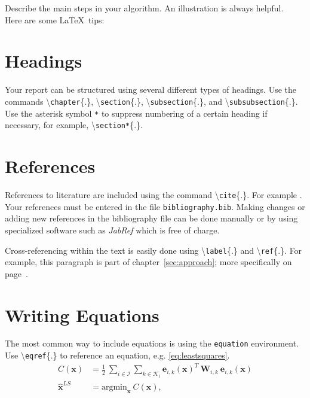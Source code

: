 Describe the main steps in your algorithm. An illustration is always helpful.\\

Here are some \LaTeX~tips:


\section{Headings}

  Your report can be structured using several different types of headings. Use the commands \textbackslash\texttt{chapter}\{.\}, \textbackslash\texttt{section}\{.\}, \textbackslash\texttt{subsection}\{.\}, and \textbackslash\texttt{subsubsection}\{.\}. Use the asterisk symbol \texttt{*} to suppress numbering of a certain heading if necessary, for example, \textbackslash\texttt{section*}\{.\}.


\section{References}\label{sec:references}

  References to literature are included using the command \textbackslash\texttt{cite}\{.\}. For example \cite{KleinMurray2007,Strasdat2010WhyFilter}. Your references must be entered in the file \texttt{bibliography.bib}. Making changes or adding new references in the bibliography file can be done manually or by using specialized software such as \textit{JabRef} which is free of charge.

  Cross-referencing within the text is easily done using \textbackslash\texttt{label}\{.\} and \textbackslash\texttt{ref}\{.\}. For example, this paragraph is part of chapter~\ref{sec:approach}; more specifically on page~\pageref{sec:references}.

\section{Writing Equations}\label{sec:math}

  The most common way to include equations is using the \texttt{equation} environment. Use \textbackslash\texttt{eqref}\{.\} to reference an equation, e.g. \eqref{eq:leastsquares}.
  \begin{equation}\label{eq:leastsquares}
      \begin{aligned}
        C(\mathbf{x}) &= \frac{1}{2} \ \sum_{i \in \mathcal I} \sum_{k \in \mathcal K_i} \mathbf{e}_{i,k}(\mathbf{x})^T \ \mathbf{W}_{i,k}  \ \mathbf{e}_{i,k}(\mathbf{x})  \\
        \hat{\mathbf{x}}^{LS} &= \text{argmin}_\mathbf{x} \ C(\mathbf{x}),
      \end{aligned}
  \end{equation}

